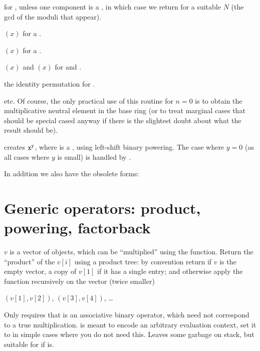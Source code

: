 \item {} for ,  unless one component
is a , in which case we return  for a suitable
$N$ (the gcd of the moduli that appear).

\item {}$(x)$ for a .

\item {}$(x)$ for a .

\item {}$(x)$ and $(x)$ for  and .

\item the identity permutation for .

\item etc. Of course, the only practical use of this routine for $n = 0$ is
to obtain the multiplicative neutral element in the base ring (or to treat
marginal cases that should be special cased anyway if there is the slightest
doubt about what the result should be).

 creates ${\tt x}^{{\tt y}}$, where  is a
, using left-shift binary powering. The case where $y = 0$
(as all cases where $y$ is small) is handled by .

In addition we also have the obsolete forms:





\section{Generic operators: product, powering, factorback}

 $v$ is a vector of
objects, which can be ``multiplied'' using the  function. Return
the ``product'' of the $v[i]$ using a product tree: by convention
return  if $v$ is the empty vector, a copy of $v[1]$ if it has a
single entry; and otherwise apply the function recursively on the vector
(twice smaller)

$(v[1],v[2])$, $(v[3],v[4])$, \dots

\noindent Only requires that  is an associative binary operator,
which need not correspond to a true multiplication.  is meant to encode
an arbitrary evaluation context, set it to  in simple cases where you
do not need this. Leaves some garbage on stack, but suitable for
 if  is.

